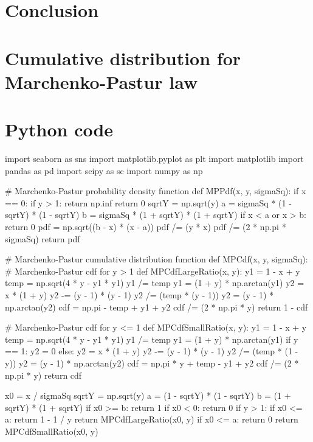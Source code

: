 \documentclass[a4paper,11pt]{article}
\theoremstyle{plain}
\theoremstyle{definition}
\begin{document}
    \pagebreak
    \part{Conclusion}
    
    \pagebreak
    \begin{appendices}
    	\part*{Cumulative distribution for Marchenko-Pastur law}
    	
    	\pagebreak
    	\part*{Python code}
    	\begin{python}
import seaborn as sns
import matplotlib.pyplot as plt
import matplotlib
import pandas as pd
import scipy as sc
import numpy as np  
  		
    		
# Marchenko-Pastur probability density function
def MPPdf(x, y, sigmaSq):
    if x == 0:
        if y > 1:
            return np.inf
        return 0
    sqrtY = np.sqrt(y)
    a = sigmaSq * (1 - sqrtY) * (1 - sqrtY)
    b = sigmaSq * (1 + sqrtY) * (1 + sqrtY)
    if x < a or x > b:
        return 0
    pdf = np.sqrt((b - x) * (x - a))
    pdf /= (y * x)
    pdf /= (2 * np.pi * sigmaSq)
    return pdf


# Marchenko-Pastur cumulative distribution function
def MPCdf(x, y, sigmaSq):
    # Marchenko-Pastur cdf for y > 1
    def MPCdfLargeRatio(x, y):
        y1 = 1 - x + y
        temp = np.sqrt(4 * y - y1 * y1)
        y1 /= temp
        y1 = (1 + y) * np.arctan(y1)
        y2 = x * (1 + y)
        y2 -= (y - 1) * (y - 1)
        y2 /= (temp * (y - 1))
        y2 = (y - 1) * np.arctan(y2)
        cdf = np.pi - temp + y1 + y2
        cdf /= (2 * np.pi * y)
        return 1 - cdf

    # Marchenko-Pastur cdf for y <= 1
    def MPCdfSmallRatio(x, y):
        y1 = 1 - x + y
        temp = np.sqrt(4 * y - y1 * y1)
        y1 /= temp
        y1 = (1 + y) * np.arctan(y1)
        if y == 1:
            y2 = 0
        else:
            y2 = x * (1 + y)
            y2 -= (y - 1) * (y - 1)
            y2 /= (temp * (1 - y))
            y2 = (y - 1) * np.arctan(y2)
        cdf = np.pi * y + temp - y1 + y2
        cdf /= (2 * np.pi * y)
        return cdf

    x0 = x / sigmaSq
    sqrtY = np.sqrt(y)
    a = (1 - sqrtY) * (1 - sqrtY)
    b = (1 + sqrtY) * (1 + sqrtY)
    if x0 >= b:
        return 1
    if x0 < 0:
        return 0
    if y > 1:
        if x0 <= a:
            return 1 - 1 / y
        return MPCdfLargeRatio(x0, y)
    if x0 <= a:
        return 0
    return MPCdfSmallRatio(x0, y)



\end{python}
\end{appendices}
\end{document}
